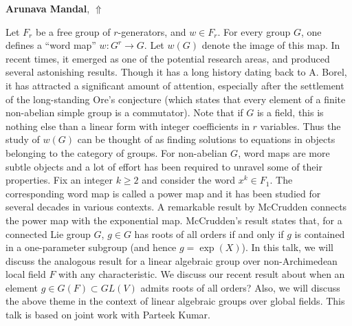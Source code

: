 \documentclass[ILAS2025-program.tex]{subfiles}
\begin{document}
\hypertarget{down0414}{}\begin{ilasabstract}
    
\textbf{Arunava Mandal},  \hfill \hyperlink{up0414}{$\Uparrow$}
    
    
\mtskip
    Let $F_r$ be a free group of $r$-generators, and $w\in F_r.$ For every group $G$, one defines a ``word map'' $w: G^r\to G$. Let $w(G)$ denote the image of this map. In recent times, it emerged as one of the potential research areas, and produced several astonishing results. Though it has a long history dating back to A. Borel, it has attracted a significant amount of attention, especially after the settlement of the long-standing Ore’s conjecture (which states that every element of a finite non-abelian simple group is a commutator). Note that if $G$ is a field, this is nothing else than a linear form with integer coefficients in $r$ variables. Thus the study of $w(G)$ can be thought of as finding solutions to equations in objects belonging to the category of groups. For non-abelian $G$, word maps are more subtle objects and a lot of effort has been required to unravel some of their properties. Fix an integer $k\geq 2$ and consider the word $x^k\in F_1$. The corresponding word map is called a power map and it has been studied for several decades in various contexts. A remarkable result by McCrudden connects the power map with the exponential map. McCrudden's result states that, for a connected Lie group $G$, $g\in G$ has roots of all orders if and only if $g$ is contained in a one-parameter subgroup (and hence $g=\exp(X)$). In this talk, we will discuss the analogous result for a linear algebraic group over non-Archimedean local field $F$ with any characteristic.  We discuss our recent result about when an element $g\in G(F)\subset GL(V)$ admits roots of all orders? Also, we will discuss the above theme in the context of linear algebraic groups over global fields.
This talk is based on joint work with Parteek Kumar.
\end{ilasabstract}
    
\end{document}
